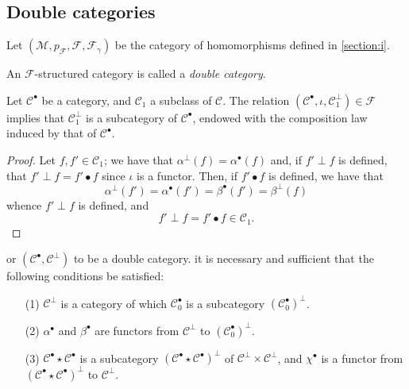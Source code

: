 \documentclass[a4paper,fleqn]{article}
\theoremstyle{plain}
\newenvironment{proposition}[1]
  {\renewcommand\theinnerproposition{#1}\innerproposition}
  {\endinnerproposition}
\newenvironment{corollary}[1]
  {\renewcommand\theinnercorollary{#1}\innercorollary}
  {\endinnercorollary}
\theoremstyle{definition}
\newenvironment{definition}[1]
  {\renewcommand\theinnerdefinition{#1}\innerdefinition}
  {\endinnerdefinition}
\newcommand{\CC}{\mathcal{C}}
\newcommand{\MM}{\mathcal{M}}
\newcommand{\FF}{\mathcal{F}}
\newcommand{\smallbullet}{\bullet}
\begin{document}
\subsection{Double categories}
\label{section:ii.4}

Let $(\MM,p_\FF,\FF,\FF_\gamma)$ be the category of homomorphisms defined in \cref{section:i}.

\begin{definition}{10}
\label{definition:ii-10}
  An $\FF$-structured category is called a \emph{double category}.
\end{definition}

\begin{proposition}{9}
\label{proposition:ii-9}
  Let $\CC^\smallbullet$ be a category, and $\CC_1$ a subclass of $\CC$.
  The relation $(\CC^\smallbullet,\iota,\CC_1^\perp)\in\FF$ implies that $\CC_1^\perp$ is a subcategory of $\CC^\smallbullet$, endowed with the composition law induced by that of $\CC^\smallbullet$.
\end{proposition}

\begin{proof}
  Let $f,f'\in\CC_1$;
  we have that $\alpha^\perp(f)=\alpha^\smallbullet(f)$ and, if $f'\perp f$ is defined, that $f'\perp f=f'\smallbullet f$ since $\iota$ is a functor.
  Then, if $f'\smallbullet f$ is defined, we have that
  \[
    \alpha^\perp(f')
    = \alpha^\smallbullet(f')
    = \beta^\smallbullet(f')
    = \beta^\perp(f)
  \]
  whence $f'\perp f$ is defined, and
  \[
    f'\perp f
    = f'\smallbullet f
    \in\CC_1.
  \]
\end{proof}

\begin{corollary}
  For $(\CC^\smallbullet,\CC^\perp)$ to be a double category. it is necessary and sufficient that the following conditions be satisfied:
  \begin{enumerate}
    \item[\normalfont(1)]
      $\CC^\perp$ is a category of which $\CC_0^\smallbullet$ is a subcategory $(\CC_0^\smallbullet)^\perp$.
    \item[\normalfont(2)]
      $\alpha^\smallbullet$ and $\beta^\smallbullet$ are functors from $\CC^\perp$ to $(\CC_0^\smallbullet)^\perp$.
    \item[\normalfont(3)]
      $\CC^\smallbullet\star\CC^\smallbullet$ is a subcategory $(\CC^\smallbullet\star\CC^\smallbullet)^\perp$ of $\CC^\perp\times\CC^\perp$, and $\chi^\smallbullet$ is a functor from $(\CC^\smallbullet\star\CC^\smallbullet)^\perp$ to $\CC^\perp$.
  \end{enumerate}
\end{corollary}
\end{document}
